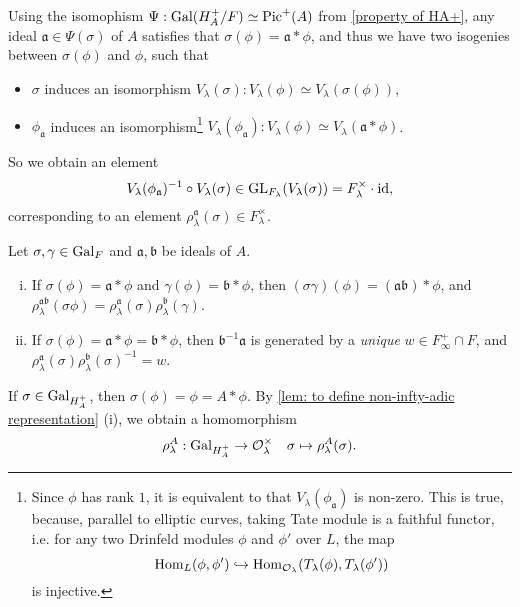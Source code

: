 \documentclass{article}
\renewcommand{\O}{\mathcal{O}}
\DeclareMathOperator{\pic}{Pic}
\begin{document}
Using the isomophism $\Psi : \gal(H_A^+/F)\simeq \pic^+(A)$ from \cref{property of HA+},
any ideal $\mathfrak{a}\in\Psi(\sigma)$ of $A$ satisfies that $\sigma(\phi) = \mathfrak{a}*\phi$,
and thus we have two isogenies between $\sigma(\phi)$ and $\phi$, such that
\begin{itemize}
    \item $\sigma$ induces an isomorphism $V_\lambda(\sigma) : V_\lambda(\phi)\simeq V_\lambda(\sigma(\phi))$,
    \item $\phi_\mathfrak{a}$ induces an isomorphism\footnote{
        Since $\phi$ has rank $1$, it is equivalent to that $V_\lambda(\phi_\mathfrak{a})$ is non-zero.
        This is true, because, parallel to elliptic curves, taking Tate module is a faithful functor, i.e. for any two Drinfeld modules $\phi$ and $\phi'$ over $L$, the map
        \[\Hom_{L}(\phi, \phi')\hookrightarrow \Hom_{\O_\lambda}(T_\lambda(\phi), T_\lambda(\phi'))\]
        is injective.
    } $V_\lambda(\phi_\mathfrak{a}) : V_\lambda(\phi)\simeq V_\lambda(\mathfrak{a}*\phi)$.
\end{itemize}
So we obtain an element \[V_\lambda(\phi_\mathfrak{a})^{-1}\circ V_\lambda(\sigma)\in\operatorname{GL}_{F_\lambda}(V_\lambda(\sigma)) = F_\lambda^\times\cdot\operatorname{id},\]
corresponding to an element $\rho_\lambda^\mathfrak{a}(\sigma)\in F_\lambda^\times$.

\begin{lemma}\label{lem: to define non-infty-adic representation}
    Let $\sigma, \gamma\in\operatorname{Gal}_F$ and $\mathfrak{a}, \mathfrak{b}$ be ideals of $A$.\begin{enumerate}[(i)]
    \item If $\sigma(\phi) = \mathfrak{a}*\phi$ and $\gamma(\phi) = \mathfrak{b}*\phi$,
    then $(\sigma\gamma)(\phi) = (\mathfrak{a}\mathfrak{b}) * \phi$, and $\rho_{\lambda}^{\mathfrak{ab}}(\sigma\phi) = \rho_\lambda^\mathfrak{a}(\sigma)\rho_\lambda^\mathfrak{b}(\gamma)$.
    \item If $\sigma(\phi) = \mathfrak{a}*\phi = \mathfrak{b}*\phi$, then $\mathfrak{b}^{-1}\mathfrak{a}$ is generated by a \textit{unique} $w\in F_\infty^+\cap F$, and $\rho_\lambda^\mathfrak{a}(\sigma)\rho_\lambda^\mathfrak{b}(\sigma)^{-1} = w$.
    \end{enumerate}
\end{lemma}

If $\sigma\in\operatorname{Gal}_{H_A^+}$,
then $\sigma(\phi) = \phi = A * \phi$.
By \cref{lem: to define non-infty-adic representation} (i),
we obtain a homomorphism
\[\rho_\lambda^A : \gal_{H_A^+}\to \O_\lambda^\times\quad \sigma\mapsto \rho_\lambda^A(\sigma).\]
\end{document}
